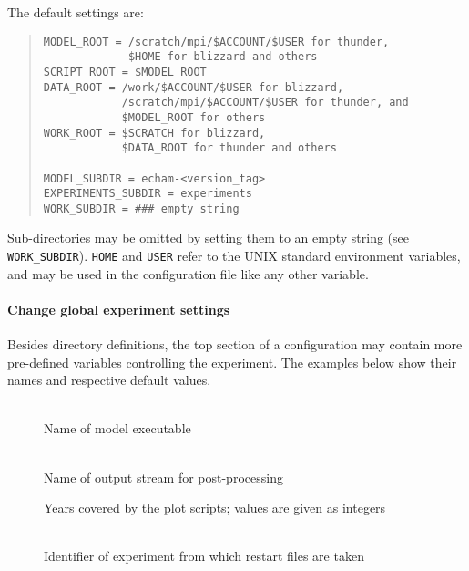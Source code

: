 The default settings are:
%
\begin{quote}
\begin{verbatim}
MODEL_ROOT = /scratch/mpi/$ACCOUNT/$USER for thunder,
             $HOME for blizzard and others
SCRIPT_ROOT = $MODEL_ROOT
DATA_ROOT = /work/$ACCOUNT/$USER for blizzard,
            /scratch/mpi/$ACCOUNT/$USER for thunder, and
            $MODEL_ROOT for others
WORK_ROOT = $SCRATCH for blizzard,
            $DATA_ROOT for thunder and others

MODEL_SUBDIR = echam-<version_tag>
EXPERIMENTS_SUBDIR = experiments
WORK_SUBDIR = ### empty string
\end{verbatim}
\end{quote}

Sub-directories may be omitted by setting them to an empty string (see
\texttt{WORK\_SUBDIR}). \texttt{HOME} and \texttt{USER} refer to the UNIX
standard environment variables, and may be used in the configuration file like
any other variable.


\paragraph*{Change global experiment settings}

Besides directory definitions, the top section of a configuration may contain
more pre-defined variables controlling the experiment. The examples below show
their names and respective default values.

\begin{description}
  
\item[]\leavevmode\\ 
  Name of model executable

\item[]\leavevmode\\ 
  Name of output stream for post-processing

\item[{\parbox[b]{\linewidth}{
  \code{PLOT\_START\_YEAR}\\
  \code{PLOT\_END\_YEAR}
}}]
  Years covered by the plot scripts; values are given as integers

\item[]\leavevmode\\ 
  Identifier of experiment from which restart files are taken

\end{description}


